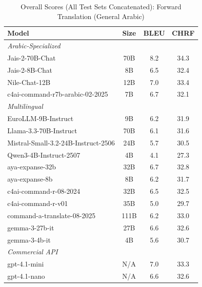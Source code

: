 \begin{table}[htbp]
\centering
\caption{Overall Scores (All Test Sets Concatenated): Forward Translation (General Arabic)}
\label{tab:overall_scores_forward_arabic_general}
\begin{tabular}{l@{\hspace{3pt}}c@{\hspace{3pt}}c@{\hspace{3pt}}c}
\toprule
Model & Size & BLEU & CHRF \\
\midrule
\multicolumn{4}{l}{\textit{Arabic-Specialized}} \\
\midrule
Jais-2-70B-Chat & 70B & 8.2 & 34.3 \\
Jais-2-8B-Chat & 8B & 6.5 & 32.4 \\
Nile-Chat-12B & 12B & 7.0 & 33.4 \\
c4ai-command-r7b-arabic-02-2025 & 7B & 6.7 & 32.1 \\
\midrule
\multicolumn{4}{l}{\textit{Multilingual}} \\
\midrule
EuroLLM-9B-Instruct & 9B & 6.2 & 31.9 \\
Llama-3.3-70B-Instruct & 70B & 6.1 & 31.6 \\
Mistral-Small-3.2-24B-Instruct-2506 & 24B & 5.7 & 30.5 \\
Qwen3-4B-Instruct-2507 & 4B & 4.1 & 27.3 \\
aya-expanse-32b & 32B & 6.7 & 32.8 \\
aya-expanse-8b & 8B & 6.2 & 31.7 \\
c4ai-command-r-08-2024 & 32B & 6.5 & 32.5 \\
c4ai-command-r-v01 & 35B & 5.0 & 29.7 \\
command-a-translate-08-2025 & 111B & 6.2 & 33.0 \\
gemma-3-27b-it & 27B & 6.6 & 32.6 \\
gemma-3-4b-it & 4B & 5.6 & 30.7 \\
\midrule
\multicolumn{4}{l}{\textit{Commercial API}} \\
\midrule
gpt-4.1-mini & N/A & 7.0 & 33.3 \\
gpt-4.1-nano & N/A & 6.6 & 32.6 \\
\midrule
\bottomrule
\end{tabular}
\end{table}